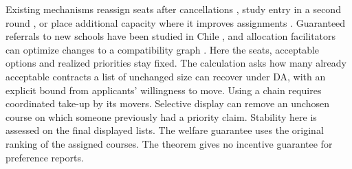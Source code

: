 Existing mechanisms reassign seats after cancellations \citep{seatReassignment}, study entry in a second round \citep{tworound}, or place additional capacity where it improves assignments \citep{capacityPlanning}. Guaranteed referrals to new schools have been studied in Chile \citep{lepesure}, and allocation facilitators can optimize changes to a compatibility graph \citep{facilitate}. Here the seats, acceptable options and realized priorities stay fixed. The calculation asks how many already acceptable contracts a list of unchanged size can recover under DA, with an explicit bound from applicants' willingness to move. Using a chain requires coordinated take-up by its movers. Selective display can remove an unchosen course on which someone previously had a priority claim. Stability here is assessed on the final displayed lists. The welfare guarantee uses the original ranking of the assigned courses. The theorem gives no incentive guarantee for preference reports.
